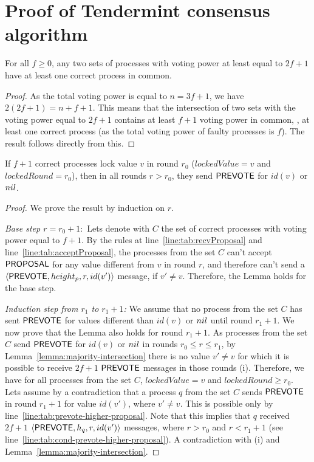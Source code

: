 \section{Proof of Tendermint consensus algorithm}
\label{sec:proof}

\begin{lemma}
	\label{lemma:majority-intersection}
	For all $f\geq 0$, any two sets of processes with voting power at least equal to $2f+1$ have
	at least one correct process in common.
\end{lemma}

\begin{proof}
	As the total voting power is equal to $n=3f+1$, we have $2(2f+1) = n+f+1$.
	This means that the intersection of two sets with the voting power equal to $2f+1$ contains at least $f+1$ voting power in common, \ie, at least one correct process (as the total voting power of faulty processes is $f$). The result follows directly from this.
\end{proof}

\begin{lemma}
	\label{lemma:locked-decision_value-prevote-v}
	If $f+1$ correct processes lock value $v$ in round $r_0$ ($lockedValue = v$ and $lockedRound = r_0$), then in all rounds $r > r_0$, they send $\mathsf{PREVOTE}$ for $id(v)$ or $nil$.
\end{lemma}

\begin{proof}
We prove the result by induction on $r$.

\emph{Base step $r = r_0 + 1:$} Lets denote with $C$ the set of correct processes with voting power equal to $f+1$. 
By the rules at line~\ref{line:tab:recvProposal} and line~\ref{line:tab:acceptProposal}, the processes from the set $C$ can't accept $\mathsf{PROPOSAL}$ for any value different from $v$ in round $r$, and therefore can't send a $\langle\mathsf{PREVOTE},height_p, r,id(v')\rangle$ message,
if $v' \neq v$. Therefore, the Lemma holds for the base step.

\emph{Induction step from $r_1$ to $r_1+1$:} We assume that no process from the set $C$ has sent $\mathsf{PREVOTE}$ for values different than $id(v)$ or $nil$ until round $r_1 + 1$. We now prove that 
the Lemma also holds for round $r_1 + 1$. As processes from the set $C$ send $\mathsf{PREVOTE}$ for $id(v)$ or $nil$ in rounds $r_0 \le r \le r_1$, by Lemma~\ref{lemma:majority-intersection}
there is no value $v' \neq v$ for which it is possible to receive $2f+1$ $\mathsf{PREVOTE}$ messages in those rounds (i). Therefore, we have for all processes from the set $C$, $lockedValue = v$ and $lockedRound \ge r_0$.   
Lets assume by a contradiction that a process $q$ from the set $C$ sends $\mathsf{PREVOTE}$ in round $r_1 + 1$ for value $id(v')$, where $v' \neq v$. This is possible only by line~\ref{line:tab:prevote-higher-proposal}. 
Note that this implies that $q$ received $2f+1$ $\langle\mathsf{PREVOTE},h_q, r,id(v')\rangle$ messages, where $r > r_0$ and $r < r_1 +1$ (see line~\ref{line:tab:cond-prevote-higher-proposal}). A contradiction with (i) and Lemma~\ref{lemma:majority-intersection}.  	
\end{proof}	

